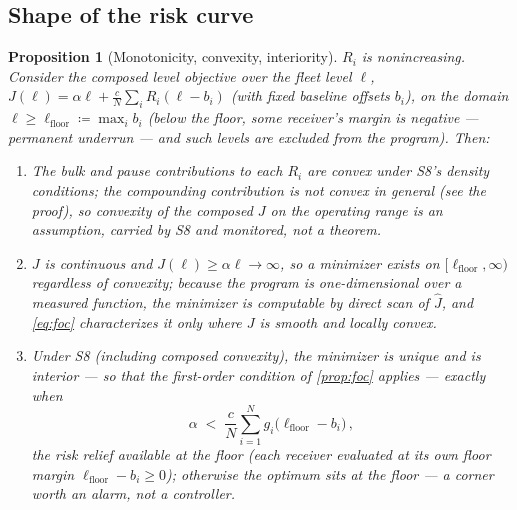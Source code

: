 \documentclass[11pt, a4paper]{article}
\theoremstyle{definition}
\theoremstyle{plain}
\newtheorem{proposition}[theorem]{Proposition}
\theoremstyle{remark}
\begin{document}
\subsection{Shape of the risk curve}\label{sec:risk-shape}

\begin{proposition}[Monotonicity, convexity, interiority]
\label{prop:risk-shape}
$R_i$ is nonincreasing.  Consider the composed level objective over
the fleet level $\ell$,
$J(\ell) = \alpha\ell + \tfrac{c}{N}\sum_i R_i(\ell - b_i)$ (with
fixed baseline offsets $b_i$), on the domain
$\ell \ge \ell_{\mathrm{floor}} \coloneqq \max_i b_i$ (below the
floor, some receiver's margin is negative --- permanent underrun ---
and such levels are excluded from the program).  Then:
\begin{enumerate}[label=(\roman*)]
  \item The bulk and pause contributions to each $R_i$ are convex
    under S8's density conditions; the compounding contribution is
    \emph{not convex in general} (see the proof), so convexity of the
    composed $J$ on the operating range is an \emph{assumption},
    carried by S8 and monitored, not a theorem.
  \item $J$ is continuous and $J(\ell) \ge \alpha\ell \to \infty$, so
    a minimizer exists on $[\ell_{\mathrm{floor}}, \infty)$ regardless
    of convexity; because the program is one-dimensional over a
    measured function, the minimizer is computable by direct scan of
    $\hat J$, and \cref{eq:foc} characterizes it only where $J$ is
    smooth and locally convex.
  \item Under S8 (including composed convexity), the minimizer is
    unique and is interior --- so that the first-order condition of
    \cref{prop:foc} applies --- exactly when
    \begin{equation}\label{eq:interior-condition}
      \alpha \;<\; \frac{c}{N}\sum_{i=1}^N
        g_i\bigl(\ell_{\mathrm{floor}} - b_i\bigr)\,,
    \end{equation}
    the risk relief available at the floor (each receiver evaluated
    at its own floor margin $\ell_{\mathrm{floor}} - b_i \ge 0$);
    otherwise the optimum sits at the floor --- a corner worth an
    alarm, not a controller.
\end{enumerate}
\end{proposition}
\end{document}
